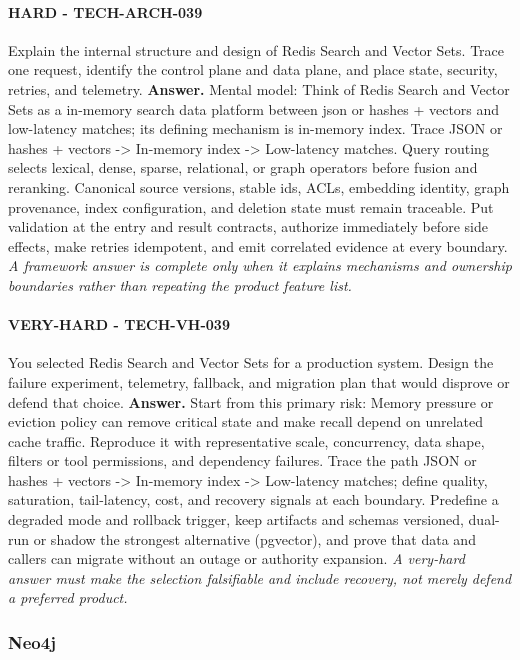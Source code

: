 \paragraph{HARD - TECH-ARCH-039} Explain the internal structure and design of Redis Search and Vector Sets. Trace one request, identify the control plane and data plane, and place state, security, retries, and telemetry.
\textbf{Answer.} Mental model: Think of Redis Search and Vector Sets as a in-memory search data platform between json or hashes + vectors and low-latency matches; its defining mechanism is in-memory index. Trace JSON or hashes + vectors -> In-memory index -> Low-latency matches. Query routing selects lexical, dense, sparse, relational, or graph operators before fusion and reranking. Canonical source versions, stable ids, ACLs, embedding identity, graph provenance, index configuration, and deletion state must remain traceable. Put validation at the entry and result contracts, authorize immediately before side effects, make retries idempotent, and emit correlated evidence at every boundary.
\textit{A framework answer is complete only when it explains mechanisms and ownership boundaries rather than repeating the product feature list.}
\paragraph{VERY-HARD - TECH-VH-039} You selected Redis Search and Vector Sets for a production system. Design the failure experiment, telemetry, fallback, and migration plan that would disprove or defend that choice.
\textbf{Answer.} Start from this primary risk: Memory pressure or eviction policy can remove critical state and make recall depend on unrelated cache traffic. Reproduce it with representative scale, concurrency, data shape, filters or tool permissions, and dependency failures. Trace the path JSON or hashes + vectors -> In-memory index -> Low-latency matches; define quality, saturation, tail-latency, cost, and recovery signals at each boundary. Predefine a degraded mode and rollback trigger, keep artifacts and schemas versioned, dual-run or shadow the strongest alternative (pgvector), and prove that data and callers can migrate without an outage or authority expansion.
\textit{A very-hard answer must make the selection falsifiable and include recovery, not merely defend a preferred product.}
\subsubsection*{Neo4j}

